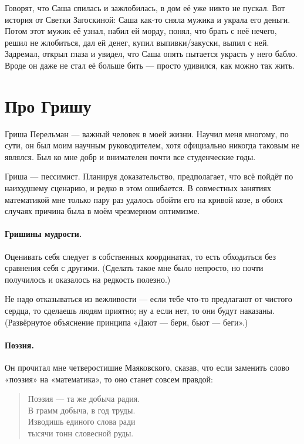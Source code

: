 \documentclass{book}
\begin{document}
Говорят, что Саша спилась и зажлобилась, в дом её уже никто не пускал.
Вот история от Светки Загоскиной:
Саша как-то сняла мужика и украла его деньги.
Потом этот мужик её узнал, набил ей морду, понял, что брать с неё нечего, решил не жлобиться, дал ей денег, купил выпивки/закуски, выпил с ней.
Задремал, открыл глаза и увидел, что Саша опять пытается украсть у него бабло.
Вроде он даже не стал её больше бить --- просто удивился, как можно так жить.

\section*{Про Гришу}

Гриша Перельман --- важный человек в моей жизни.
Научил меня многому, по сути, он был моим научным руководителем, хотя официально никогда таковым не являлся.
Был ко мне добр и внимателен почти все студенческие годы.

Гриша --- пессимист.
Планируя доказательство, предполагает, что всё пойдёт по наихудшему сценарию, и редко в этом ошибается.
В совместных занятиях математикой мне только пару раз удалось обойти его на кривой козе, в обоих случаях причина была в моём чрезмерном оптимизме.

\paragraph{Гришины мудрости.}
Оценивать себя следует в собственных координатах, то есть обходиться без сравнения себя с другими.
(Сделать такое мне было непросто, но почти получилось и оказалось на редкость полезно.)

Не надо отказываться из вежливости  --- если тебе что-то предлагают от чистого сердца, то сделаешь людям приятно; ну а если нет, то они будут наказаны.
(Развёрнутое объяснение принципа «Дают --- бери, бьют --- беги».)

\paragraph{Поэзия.}
Он прочитал мне четверостишие Маяковского,
сказав, что если заменить слово «поэзия» на «математика», то оно станет совсем правдой: 
\begin{verse}
Поэзия — та же добыча радия.\\
В грамм добыча, в год труды.\\
Изводишь единого слова ради\\
тысячи тонн словесной руды.\\
\end{verse}
\end{document}
